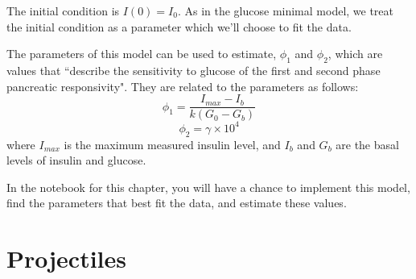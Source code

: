 \documentclass[12pt]{book}
\theoremstyle{exercise}
\begin{document}
The initial condition is $I(0) = I_0$.  As in the glucose minimal model, we treat the initial condition as a parameter which we'll choose to fit the data.

The parameters of this model can be used to estimate, $\phi_1$ and $\phi_2$, which are values that ``describe the sensitivity to glucose of the first and second phase pancreatic responsivity".  They are related to the parameters as follows:
%
\[ \phi_1 = \frac{I_{max} - I_b}{k (G_0 - G_b)}\]
%
\[ \phi_2 = \gamma \times 10^4 \]
%
where $I_{max}$ is the maximum measured insulin level, and $I_b$ and $G_b$ are the basal levels of insulin and glucose.

In the notebook for this chapter, you will have a chance to implement this model, find the parameters that best fit the data, and estimate these values.


\chapter{Projectiles}



\backmatter
\printindex
\end{document}
